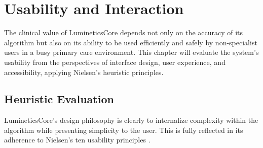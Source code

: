 \documentclass[sigplan,screen]{acmart}
\begin{document}
\section{Usability and Interaction}

The clinical value of LumineticsCore depends not only on the accuracy of its algorithm but also on its ability to be used efficiently and safely by non-specialist users in a busy primary care environment. This chapter will evaluate the system's usability from the perspectives of interface design, user experience, and accessibility, applying Nielsen's heuristic principles.

\subsection{Heuristic Evaluation}

LumineticsCore's design philosophy is clearly to internalize complexity within the algorithm while presenting simplicity to the user. This is fully reflected in its adherence to Nielsen's ten usability principles \cite{nielsen2020usability}.
\end{document}
